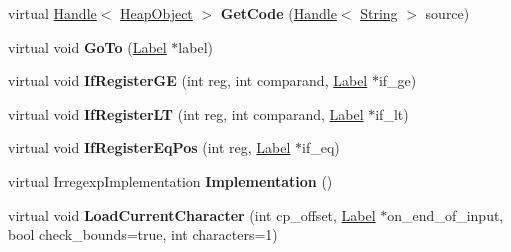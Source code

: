 \begin{DoxyCompactItemize}
\item 
virtual \hyperlink{classv8_1_1internal_1_1_handle}{Handle}$<$ \hyperlink{classv8_1_1internal_1_1_heap_object}{Heap\+Object} $>$ {\bfseries Get\+Code} (\hyperlink{classv8_1_1internal_1_1_handle}{Handle}$<$ \hyperlink{classv8_1_1internal_1_1_string}{String} $>$ source)\hypertarget{classv8_1_1internal_1_1_reg_exp_macro_assembler_tracer_a46df7fc720c58dfc1832d9fa6b848714}{}\label{classv8_1_1internal_1_1_reg_exp_macro_assembler_tracer_a46df7fc720c58dfc1832d9fa6b848714}

\item 
virtual void {\bfseries Go\+To} (\hyperlink{classv8_1_1internal_1_1_label}{Label} $\ast$label)\hypertarget{classv8_1_1internal_1_1_reg_exp_macro_assembler_tracer_a614bcded3fb3d51d3dfc2b44208e759a}{}\label{classv8_1_1internal_1_1_reg_exp_macro_assembler_tracer_a614bcded3fb3d51d3dfc2b44208e759a}

\item 
virtual void {\bfseries If\+Register\+GE} (int reg, int comparand, \hyperlink{classv8_1_1internal_1_1_label}{Label} $\ast$if\+\_\+ge)\hypertarget{classv8_1_1internal_1_1_reg_exp_macro_assembler_tracer_ab08520847b58c841406830f1334e3404}{}\label{classv8_1_1internal_1_1_reg_exp_macro_assembler_tracer_ab08520847b58c841406830f1334e3404}

\item 
virtual void {\bfseries If\+Register\+LT} (int reg, int comparand, \hyperlink{classv8_1_1internal_1_1_label}{Label} $\ast$if\+\_\+lt)\hypertarget{classv8_1_1internal_1_1_reg_exp_macro_assembler_tracer_a4fdd33e492f4d0542ea2d3e56379bcb2}{}\label{classv8_1_1internal_1_1_reg_exp_macro_assembler_tracer_a4fdd33e492f4d0542ea2d3e56379bcb2}

\item 
virtual void {\bfseries If\+Register\+Eq\+Pos} (int reg, \hyperlink{classv8_1_1internal_1_1_label}{Label} $\ast$if\+\_\+eq)\hypertarget{classv8_1_1internal_1_1_reg_exp_macro_assembler_tracer_a7de6f340567bbd0d28db32177d03995c}{}\label{classv8_1_1internal_1_1_reg_exp_macro_assembler_tracer_a7de6f340567bbd0d28db32177d03995c}

\item 
virtual Irregexp\+Implementation {\bfseries Implementation} ()\hypertarget{classv8_1_1internal_1_1_reg_exp_macro_assembler_tracer_acb598ed5fdd8816f391f13a5518aced6}{}\label{classv8_1_1internal_1_1_reg_exp_macro_assembler_tracer_acb598ed5fdd8816f391f13a5518aced6}

\item 
virtual void {\bfseries Load\+Current\+Character} (int cp\+\_\+offset, \hyperlink{classv8_1_1internal_1_1_label}{Label} $\ast$on\+\_\+end\+\_\+of\+\_\+input, bool check\+\_\+bounds=true, int characters=1)\hypertarget{classv8_1_1internal_1_1_reg_exp_macro_assembler_tracer_a484bc51c470fe1b603a7c744a21df877}{}\label{classv8_1_1internal_1_1_reg_exp_macro_assembler_tracer_a484bc51c470fe1b603a7c744a21df877}


\end{DoxyCompactItemize}

